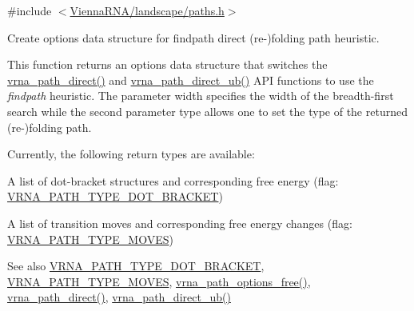 {\ttfamily \#include $<$\mbox{\hyperlink{paths_8h}{Vienna\+R\+N\+A/landscape/paths.\+h}}$>$}



Create options data structure for findpath direct (re-\/)folding path heuristic. 

This function returns an options data structure that switches the \mbox{\hyperlink{group__paths__direct_gacba096caf9a6fe134f33a5afcf2248d8}{vrna\+\_\+path\+\_\+direct()}} and \mbox{\hyperlink{group__paths__direct_ga51d9edaeb42d1d178ea8ba46ccd4c8c0}{vrna\+\_\+path\+\_\+direct\+\_\+ub()}} A\+PI functions to use the {\itshape findpath} \cite{flamm:2001} heuristic. The parameter {\ttfamily width} specifies the width of the breadth-\/first search while the second parameter {\ttfamily type} allows one to set the type of the returned (re-\/)folding path.

Currently, the following return types are available\+:
\begin{DoxyItemize}
\item A list of dot-\/bracket structures and corresponding free energy (flag\+: \mbox{\hyperlink{group__paths_ga3e964156b52440b65fae5e2a48750d8e}{V\+R\+N\+A\+\_\+\+P\+A\+T\+H\+\_\+\+T\+Y\+P\+E\+\_\+\+D\+O\+T\+\_\+\+B\+R\+A\+C\+K\+ET}})
\item A list of transition moves and corresponding free energy changes (flag\+: \mbox{\hyperlink{group__paths_gaa73703da105dc6c98957fb8247c93f1f}{V\+R\+N\+A\+\_\+\+P\+A\+T\+H\+\_\+\+T\+Y\+P\+E\+\_\+\+M\+O\+V\+ES}})
\end{DoxyItemize}

\begin{DoxySeeAlso}{See also}
\mbox{\hyperlink{group__paths_ga3e964156b52440b65fae5e2a48750d8e}{V\+R\+N\+A\+\_\+\+P\+A\+T\+H\+\_\+\+T\+Y\+P\+E\+\_\+\+D\+O\+T\+\_\+\+B\+R\+A\+C\+K\+ET}}, \mbox{\hyperlink{group__paths_gaa73703da105dc6c98957fb8247c93f1f}{V\+R\+N\+A\+\_\+\+P\+A\+T\+H\+\_\+\+T\+Y\+P\+E\+\_\+\+M\+O\+V\+ES}}, \mbox{\hyperlink{group__paths_gaa64a86b13cb165346a0d0c788781512a}{vrna\+\_\+path\+\_\+options\+\_\+free()}}, \mbox{\hyperlink{group__paths__direct_gacba096caf9a6fe134f33a5afcf2248d8}{vrna\+\_\+path\+\_\+direct()}}, \mbox{\hyperlink{group__paths__direct_ga51d9edaeb42d1d178ea8ba46ccd4c8c0}{vrna\+\_\+path\+\_\+direct\+\_\+ub()}}
\end{DoxySeeAlso}

